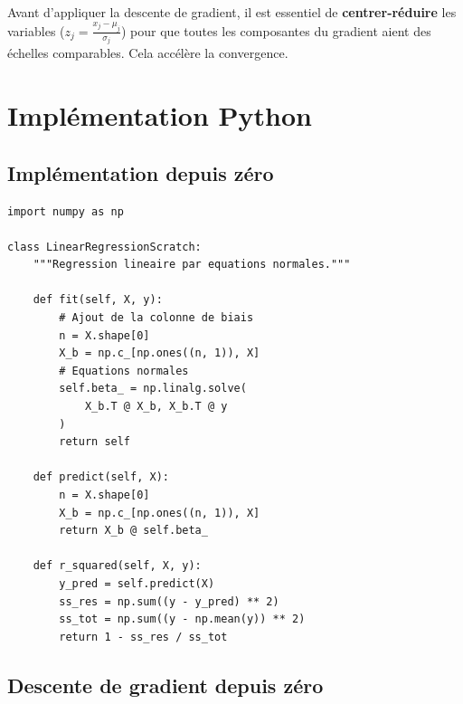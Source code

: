 \begin{bonnepratique}[title=\textbf{Normalisation des variables}]
Avant d'appliquer la descente de gradient, il est essentiel de \textbf{centrer-r\'eduire}
les variables ($z_j = \frac{x_j - \mu_j}{\sigma_j}$) pour que toutes les composantes du
gradient aient des \'echelles comparables. Cela acc\'el\`ere la convergence.
\end{bonnepratique}

\section{Impl\'ementation Python}
\label{sec:reg-python}

\subsection{Impl\'ementation depuis z\'ero}

\begin{codeblock}[title=\textbf{R\'egression lin\'eaire -- impl\'ementation manuelle}]
\begin{verbatim}
import numpy as np

class LinearRegressionScratch:
    """Regression lineaire par equations normales."""

    def fit(self, X, y):
        # Ajout de la colonne de biais
        n = X.shape[0]
        X_b = np.c_[np.ones((n, 1)), X]
        # Equations normales
        self.beta_ = np.linalg.solve(
            X_b.T @ X_b, X_b.T @ y
        )
        return self

    def predict(self, X):
        n = X.shape[0]
        X_b = np.c_[np.ones((n, 1)), X]
        return X_b @ self.beta_

    def r_squared(self, X, y):
        y_pred = self.predict(X)
        ss_res = np.sum((y - y_pred) ** 2)
        ss_tot = np.sum((y - np.mean(y)) ** 2)
        return 1 - ss_res / ss_tot
\end{verbatim}
\end{codeblock}

\subsection{Descente de gradient depuis z\'ero}

